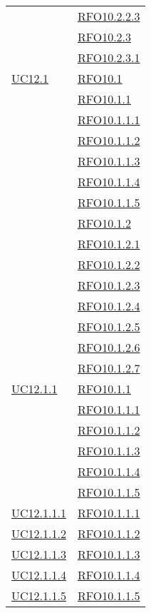 \begin{longtable}{|>{\centering}m{5cm}|m{5cm}<{\centering}|}
& \hyperlink{RFO10.2.2.3}{RFO10.2.2.3}\\
& \hyperlink{RFO10.2.3}{RFO10.2.3}\\
& \hyperlink{RFO10.2.3.1}{RFO10.2.3.1}\\\hline
\hyperlink{UC12.1}{UC12.1} & \hyperlink{RFO10.1}{RFO10.1}\\
& \hyperlink{RFO10.1.1}{RFO10.1.1}\\
& \hyperlink{RFO10.1.1.1}{RFO10.1.1.1}\\
& \hyperlink{RFO10.1.1.2}{RFO10.1.1.2}\\
& \hyperlink{RFO10.1.1.3}{RFO10.1.1.3}\\
& \hyperlink{RFO10.1.1.4}{RFO10.1.1.4}\\
& \hyperlink{RFO10.1.1.5}{RFO10.1.1.5}\\
& \hyperlink{RFO10.1.2}{RFO10.1.2}\\
& \hyperlink{RFO10.1.2.1}{RFO10.1.2.1}\\
& \hyperlink{RFO10.1.2.2}{RFO10.1.2.2}\\
& \hyperlink{RFO10.1.2.3}{RFO10.1.2.3}\\
& \hyperlink{RFO10.1.2.4}{RFO10.1.2.4}\\
& \hyperlink{RFO10.1.2.5}{RFO10.1.2.5}\\
& \hyperlink{RFO10.1.2.6}{RFO10.1.2.6}\\
& \hyperlink{RFO10.1.2.7}{RFO10.1.2.7}\\\hline
\hyperlink{UC12.1.1}{UC12.1.1} & \hyperlink{RFO10.1.1}{RFO10.1.1}\\
& \hyperlink{RFO10.1.1.1}{RFO10.1.1.1}\\
& \hyperlink{RFO10.1.1.2}{RFO10.1.1.2}\\
& \hyperlink{RFO10.1.1.3}{RFO10.1.1.3}\\
& \hyperlink{RFO10.1.1.4}{RFO10.1.1.4}\\
& \hyperlink{RFO10.1.1.5}{RFO10.1.1.5}\\\hline
\hyperlink{UC12.1.1.1}{UC12.1.1.1} & \hyperlink{RFO10.1.1.1}{RFO10.1.1.1}\\\hline
\hyperlink{UC12.1.1.2}{UC12.1.1.2} & \hyperlink{RFO10.1.1.2}{RFO10.1.1.2}\\\hline
\hyperlink{UC12.1.1.3}{UC12.1.1.3} & \hyperlink{RFO10.1.1.3}{RFO10.1.1.3}\\\hline
\hyperlink{UC12.1.1.4}{UC12.1.1.4} & \hyperlink{RFO10.1.1.4}{RFO10.1.1.4}\\\hline
\hyperlink{UC12.1.1.5}{UC12.1.1.5} & \hyperlink{RFO10.1.1.5}{RFO10.1.1.5}\\\hline

\end{longtable}
